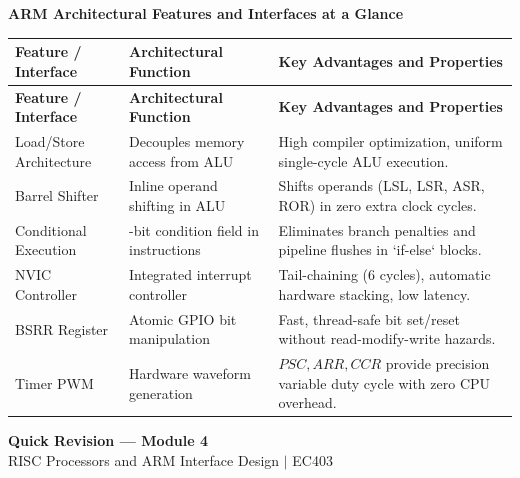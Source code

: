 \documentclass[12pt,a4paper]{article}
\begin{document}
\begingroup
\par\smallskip\noindent \textbf{ARM Architectural Features and Interfaces at a Glance}\par\nobreak
\par\vspace{5pt}
\begingroup
\setlength{\extrarowheight}{2.5pt}
\begingroup
\setlength{\LTleft}{0pt}
\setlength{\LTright}{0pt}
\begin{longtable}{|B{3.2cm}|>{\small\raggedright\arraybackslash}m{\dimexpr(\linewidth-3.2cm-6\arrayrulewidth)/2\relax}|>{\small\raggedright\arraybackslash}m{\dimexpr(\linewidth-3.2cm-6\arrayrulewidth)/2\relax}|}
\hline
\textbf{Feature / Interface} & \textbf{Architectural Function} & \textbf{Key Advantages and Properties} \\ \hline
\endfirsthead
\hline
\textbf{Feature / Interface} & \textbf{Architectural Function} & \textbf{Key Advantages and Properties} \\ \hline
\endhead
Load/Store Architecture & Decouples memory access from ALU & High compiler optimization, uniform single-cycle ALU execution. \\ \hline
Barrel Shifter & Inline operand shifting in ALU & Shifts operands (LSL, LSR, ASR, ROR) in zero extra clock cycles. \\ \hline
Conditional Execution & 4-bit condition field in instructions & Eliminates branch penalties and pipeline flushes in `if-else` blocks. \\ \hline
NVIC Controller & Integrated interrupt controller & Tail-chaining (6 cycles), automatic hardware stacking, low latency. \\ \hline
BSRR Register & Atomic GPIO bit manipulation & Fast, thread-safe bit set/reset without read-modify-write hazards. \\ \hline
Timer PWM & Hardware waveform generation & $PSC, ARR, CCR$ provide precision variable duty cycle with zero CPU overhead. \\ \hline
\end{longtable}
\endgroup\par
\endgroup
\endgroup

\newpage
\begin{center}
  {\large\bfseries\color{myred} Quick Revision --- Module 4}\\[3pt]
  {\small\color{mydark} RISC Processors and ARM Interface Design $|$ EC403}
\end{center}
\noindent{\color{myred}\rule{\linewidth}{1.2pt}}\vspace{4pt}
\end{document}
